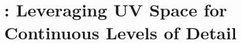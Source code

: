 \chapter{\clog: Leveraging UV Space for Continuous Levels of Detail}
\newcommand{\clogdirname}{6_clog}
\newcommand{\clogassets}{assets/\clogdirname/}


\clogteaserfigure







% 


